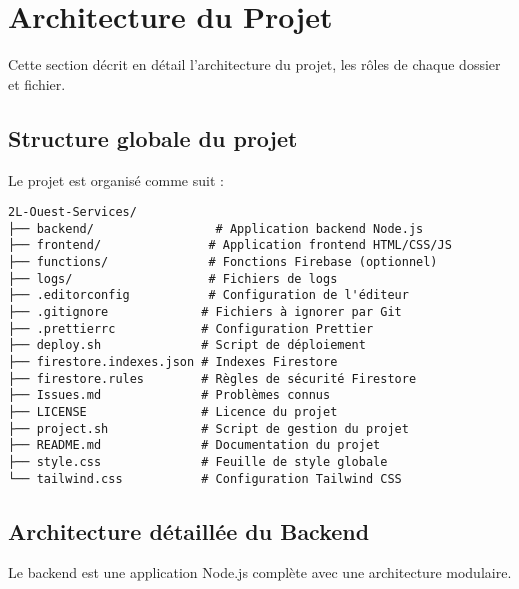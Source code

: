 \documentclass[12pt, a4paper]{article}
\begin{document}
\section{Architecture du Projet}
Cette section décrit en détail l'architecture du projet, les rôles de chaque dossier et fichier.

\subsection{Structure globale du projet}
Le projet est organisé comme suit :
\begin{lstlisting}
2L-Ouest-Services/
├── backend/                 # Application backend Node.js
├── frontend/               # Application frontend HTML/CSS/JS
├── functions/              # Fonctions Firebase (optionnel)
├── logs/                   # Fichiers de logs
├── .editorconfig           # Configuration de l'éditeur
├── .gitignore             # Fichiers à ignorer par Git
├── .prettierrc            # Configuration Prettier
├── deploy.sh              # Script de déploiement
├── firestore.indexes.json # Indexes Firestore
├── firestore.rules        # Règles de sécurité Firestore
├── Issues.md              # Problèmes connus
├── LICENSE                # Licence du projet
├── project.sh             # Script de gestion du projet
├── README.md              # Documentation du projet
├── style.css              # Feuille de style globale
└── tailwind.css           # Configuration Tailwind CSS
\end{lstlisting}

\subsection{Architecture détaillée du Backend}
Le backend est une application Node.js complète avec une architecture modulaire.
\end{document}
